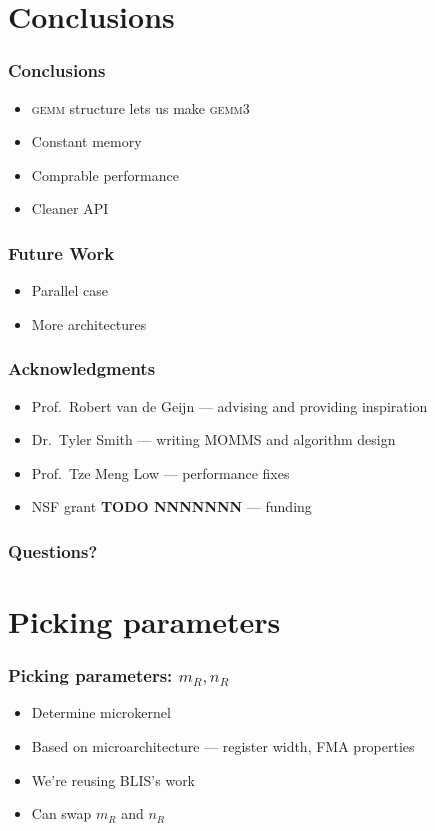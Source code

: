 \documentclass{beamer}
\newcommand*{\gemmt}{{\textsc{gemm3}}}
\newcommand*{\gemm}{{\textsc{gemm}}}
\begin{document}
\section{Conclusions}
\begin{frame}
  \frametitle{Conclusions}
  \begin{itemize}
  \item \gemm{} structure lets us make \gemmt{}
  \item Constant memory
  \item Comprable performance
  \item Cleaner API
  \end{itemize}
\end{frame}

\begin{frame}
  \frametitle{Future Work}
  \begin{itemize}
  \item Parallel case
  \item More architectures
  \end{itemize}
\end{frame}

\begin{frame}
  \frametitle{Acknowledgments}
  \begin{itemize}
  \item Prof.\ Robert van de Geijn --- advising and providing inspiration
  \item Dr.\ Tyler Smith --- writing MOMMS and algorithm design
  \item Prof.\ Tze Meng Low --- performance fixes
  \item NSF grant \textbf{TODO NNNNNNN} --- funding
  \end{itemize}
\end{frame}

\begin{frame}
  \frametitle{Questions?}
\end{frame}

\section{Picking parameters}
\begin{frame}
  \frametitle{Picking parameters: $m_R, n_R$}
  \begin{itemize}
  \item Determine microkernel
  \item Based on microarchitecture --- register width, FMA properties
  \item We're reusing BLIS's work
  \item Can swap $m_R$ and $n_R$
  \end{itemize}
\end{frame}
\end{document}
